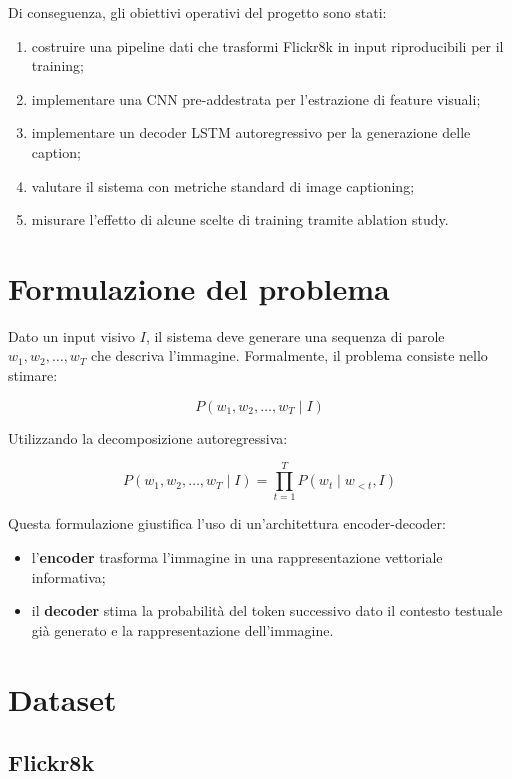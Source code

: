 \documentclass[12pt,a4paper]{article}
\begin{document}
Di conseguenza, gli obiettivi operativi del progetto sono stati:
\begin{enumerate}[leftmargin=*]
    \item costruire una pipeline dati che trasformi Flickr8k in input riproducibili per il training;
    \item implementare una CNN pre-addestrata per l'estrazione di feature visuali;
    \item implementare un decoder LSTM autoregressivo per la generazione delle caption;
    \item valutare il sistema con metriche standard di image captioning;
    \item misurare l'effetto di alcune scelte di training tramite ablation study.
\end{enumerate}

\section{Formulazione del problema}

Dato un input visivo \(I\), il sistema deve generare una sequenza di parole \(w_1, w_2, \dots, w_T\) che descriva l'immagine. Formalmente, il problema consiste nello stimare:

\[
P(w_1, w_2, \dots, w_T \mid I)
\]

Utilizzando la decomposizione autoregressiva:

\[
P(w_1, w_2, \dots, w_T \mid I) = \prod_{t=1}^{T} P(w_t \mid w_{<t}, I)
\]

Questa formulazione giustifica l'uso di un'architettura encoder-decoder:
\begin{itemize}[leftmargin=*]
    \item l'\textbf{encoder} trasforma l'immagine in una rappresentazione vettoriale informativa;
    \item il \textbf{decoder} stima la probabilità del token successivo dato il contesto testuale già generato e la rappresentazione dell'immagine.
\end{itemize}

\section{Dataset}

\subsection{Flickr8k}
\end{document}
